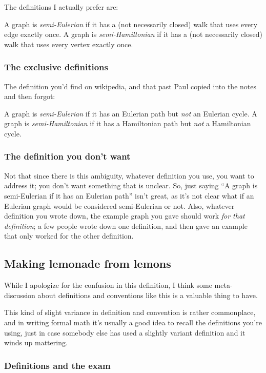 \documentclass{amsart}
\begin{document}
The definitions I actually prefer are:

A graph is \emph{semi-Eulerian} if it has a (not necessarily closed) walk that uses every edge exactly once. A graph is \emph{semi-Hamiltonian} if it has a (not necessarily closed) walk that uses every vertex exactly once.

\subsubsection*{The exclusive definitions}

The definition you'd find on wikipedia, and that past Paul copied into the notes and then forgot:

A graph is \emph{semi-Eulerian} if it has an Eulerian path but \emph{not} an Eulerian cycle.  A graph is \emph{semi-Hamiltonian} if it has a Hamiltonian path but \emph{not} a Hamiltonian cycle.

\subsubsection*{The definition you don't want}

Not that since there is this ambiguity, whatever definition you use, you want to address it; you don't want something that is unclear.  So, just saying ``A graph is semi-Eulerian if it has an Eulerian path'' isn't great, as it's not clear what if an Eulerian graph would be considered semi-Eulerian or not.  Also, whatever definition you wrote down, the example graph you gave should work \emph{for that definition}; a few people wrote down one definition, and then gave an example that only worked for the other definition.

\subsection{Making lemonade from lemons}
While I apologize for the confusion in this definition, I think some meta-discussion about definitions and conventions like this is a valuable thing to have.

This kind of slight variance in definition and convention is rather commonplace, and in writing formal math it's usually a good idea to recall the definitions you're using, just in case somebody else has used a slightly variant definition and it winds up mattering.


\subsubsection*{Definitions and the exam}
\end{document}
